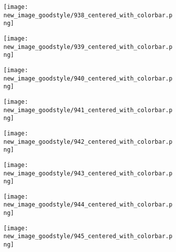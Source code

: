 \documentclass[a4paper,12pt]{article}
\begin{document}
\begin{figure}[H]
  \begin{subfigure}{0.11\textwidth}
    \texttt{[image: new\_image\_goodstyle/938\_centered\_with\_colorbar.png]}
  \end{subfigure}
  \hfill
  \begin{subfigure}{0.11\textwidth}
    \texttt{[image: new\_image\_goodstyle/939\_centered\_with\_colorbar.png]}
  \end{subfigure}
  \hfill
  \begin{subfigure}{0.11\textwidth}
    \texttt{[image: new\_image\_goodstyle/940\_centered\_with\_colorbar.png]}
  \end{subfigure}
  \hfill
  \begin{subfigure}{0.11\textwidth}
    \texttt{[image: new\_image\_goodstyle/941\_centered\_with\_colorbar.png]}
  \end{subfigure}
  \hfill
  \begin{subfigure}{0.11\textwidth}
    \texttt{[image: new\_image\_goodstyle/942\_centered\_with\_colorbar.png]}
  \end{subfigure}
  \hfill
  \begin{subfigure}{0.11\textwidth}
    \texttt{[image: new\_image\_goodstyle/943\_centered\_with\_colorbar.png]}
  \end{subfigure}
  \hfill
  \begin{subfigure}{0.11\textwidth}
    \texttt{[image: new\_image\_goodstyle/944\_centered\_with\_colorbar.png]}
  \end{subfigure}
  \hfill
  \begin{subfigure}{0.11\textwidth}
    \texttt{[image: new\_image\_goodstyle/945\_centered\_with\_colorbar.png]}
  \end{subfigure}
  \hfill
\end{figure}
\end{document}
